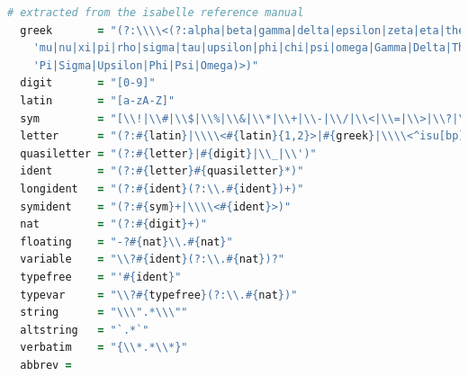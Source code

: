 \begin{lstlisting}[language=coffee]
  # extracted from the isabelle reference manual
  greek       = "(?:\\\\<(?:alpha|beta|gamma|delta|epsilon|zeta|eta|theta|iota|kappa|' +
    'mu|nu|xi|pi|rho|sigma|tau|upsilon|phi|chi|psi|omega|Gamma|Delta|Theta|Lambda|Xi|' +
    'Pi|Sigma|Upsilon|Phi|Psi|Omega)>)"
  digit       = "[0-9]"
  latin       = "[a-zA-Z]"
  sym         = "[\\!|\\#|\\$|\\%|\\&|\\*|\\+|\\-|\\/|\\<|\\=|\\>|\\?|\\@|\\^|\\_|\\||\\~]"
  letter      = "(?:#{latin}|\\\\<#{latin}{1,2}>|#{greek}|\\\\<^isu[bp]>)"
  quasiletter = "(?:#{letter}|#{digit}|\\_|\\')"
  ident       = "(?:#{letter}#{quasiletter}*)"
  longident   = "(?:#{ident}(?:\\.#{ident})+)"
  symident    = "(?:#{sym}+|\\\\<#{ident}>)"
  nat         = "(?:#{digit}+)"
  floating    = "-?#{nat}\\.#{nat}"  
  variable    = "\\?#{ident}(?:\\.#{nat})?"
  typefree    = "'#{ident}"
  typevar     = "\\?#{typefree}(?:\\.#{nat})"
  string      = "\\\".*\\\""
  altstring   = "`.*`"
  verbatim    = "{\\*.*\\*}"  
  abbrev =

\end{lstlisting}
